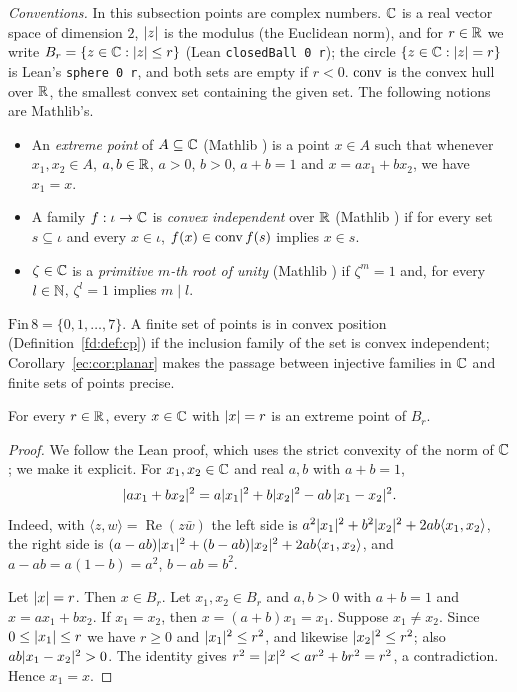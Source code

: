 \emph{Conventions.} In this subsection points are complex numbers. $\mathbb C$ is a real vector space of dimension $2$,
$\lvert z\rvert$ is the modulus (the Euclidean norm), and for $r\in\mathbb R$ we write $B_r=\{z\in\mathbb C:\lvert z\rvert\le r\}$ (Lean
\texttt{closedBall 0 r}); the circle $\{z\in\mathbb C:\lvert z\rvert=r\}$ is Lean's \texttt{sphere 0 r}, and both sets are empty if
$r<0$. $\operatorname{conv}$ is the convex hull over $\mathbb R$, the smallest convex set containing the given set. The following notions are
Mathlib's.
\begin{itemize}
\item An \emph{extreme point} of $A\subseteq\mathbb C$ (Mathlib ) is a point $x\in A$ such that
  whenever $x_1,x_2\in A$, $a,b\in\mathbb R$, $a>0$, $b>0$, $a+b=1$ and $x=ax_1+bx_2$, we have $x_1=x$.
\item A family $f:\iota\to\mathbb C$ is \emph{convex independent} over $\mathbb R$ (Mathlib ) if for every
  set $s\subseteq\iota$ and every $x\in\iota$, $f(x)\in\operatorname{conv} f(s)$ implies $x\in s$.
\item $\zeta\in\mathbb C$ is a \emph{primitive $m$-th root of unity} (Mathlib ) if $\zeta^m=1$ and,
  for every $l\in\mathbb N$, $\zeta^l=1$ implies $m\mid l$.
\end{itemize}
$\mathrm{Fin}\,8=\{0,1,\dots,7\}$. A finite set of points is in convex position (Definition~\ref{fd:def:cp}) if the
inclusion family of the set is convex independent; Corollary~\ref{ec:cor:planar} makes the passage between injective
families in $\mathbb C$ and finite sets of points precise.

\begin{lemma}\label{ec:lem:sphere}
For every $r\in\mathbb R$, every $x\in\mathbb C$ with $\lvert x\rvert=r$ is an extreme point of $B_r$.
\end{lemma}

\begin{proof}
We follow the Lean proof, which uses the strict convexity of the norm of $\mathbb C$; we make it explicit. For
$x_1,x_2\in\mathbb C$ and real $a,b$ with $a+b=1$,
\begin{equation*}
\lvert ax_1+bx_2\rvert^2=a\lvert x_1\rvert^2+b\lvert x_2\rvert^2-ab\,\lvert x_1-x_2\rvert^2 .
\end{equation*}
Indeed, with $\langle z,w\rangle=\operatorname{Re}(z\bar w)$ the left side is
$a^2\lvert x_1\rvert^2+b^2\lvert x_2\rvert^2+2ab\langle x_1,x_2\rangle$, the right side is
$(a-ab)\lvert x_1\rvert^2+(b-ab)\lvert x_2\rvert^2+2ab\langle x_1,x_2\rangle$, and $a-ab=a(1-b)=a^2$, $b-ab=b^2$.

Let $\lvert x\rvert=r$. Then $x\in B_r$. Let $x_1,x_2\in B_r$ and $a,b>0$ with $a+b=1$ and $x=ax_1+bx_2$. If $x_1=x_2$, then
$x=(a+b)x_1=x_1$. Suppose $x_1\ne x_2$. Since $0\le\lvert x_1\rvert\le r$ we have $r\ge0$ and $\lvert x_1\rvert^2\le r^2$, and
likewise $\lvert x_2\rvert^2\le r^2$; also $ab\lvert x_1-x_2\rvert^2>0$. The identity gives
$r^2=\lvert x\rvert^2<ar^2+br^2=r^2$, a contradiction. Hence $x_1=x$.
\end{proof}

